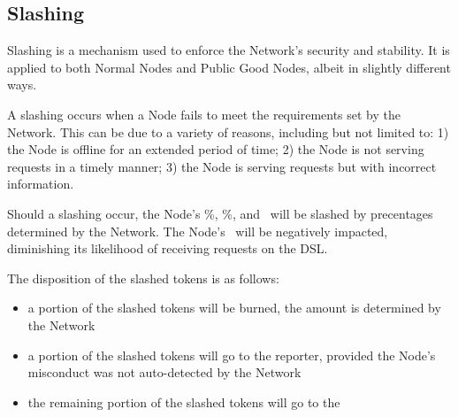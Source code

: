 \subsection{Slashing}

Slashing is a mechanism used to enforce the Network's security and stability. It is applied to both Normal Nodes and Public Good Nodes, albeit in slightly different ways.

A slashing occurs when a Node fails to meet the requirements set by the Network. This can be due to a variety of reasons, including but not limited to: 1) the Node is offline for an extended period of time; 2) the Node is not serving requests in a timely manner; 3) the Node is serving requests but with incorrect information.

Should a slashing occur, the Node's \deposit\%, \stakingPool\%, and \networkReward\ will be slashed by precentages determined by the Network.
The Node's \reliabilityScore\ will be negatively impacted, diminishing its likelihood of receiving requests on the \gls{DSL}.

The disposition of the slashed tokens is as follows:
\begin{itemize}
    \item a portion of the slashed tokens will be burned, the amount is determined by the Network
    \item a portion of the slashed tokens will go to the reporter, provided the Node’s misconduct was not auto-detected by the Network
    \item the remaining portion of the slashed tokens will go to the \publicGoodPool
\end{itemize}

